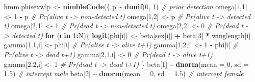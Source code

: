 \documentclass[
  12pt,
]{krantz}
\newenvironment{Shaded}{\begin{snugshade}}{\end{snugshade}}
\newcommand{\AttributeTok}[1]{\textcolor[rgb]{0.13,0.29,0.53}{#1}}
\newcommand{\CommentTok}[1]{\textcolor[rgb]{0.56,0.35,0.01}{\textit{#1}}}
\newcommand{\ControlFlowTok}[1]{\textcolor[rgb]{0.13,0.29,0.53}{\textbf{#1}}}
\newcommand{\DecValTok}[1]{\textcolor[rgb]{0.00,0.00,0.81}{#1}}
\newcommand{\FloatTok}[1]{\textcolor[rgb]{0.00,0.00,0.81}{#1}}
\newcommand{\FunctionTok}[1]{\textcolor[rgb]{0.13,0.29,0.53}{\textbf{#1}}}
\newcommand{\NormalTok}[1]{#1}
\newcommand{\OtherTok}[1]{\textcolor[rgb]{0.56,0.35,0.01}{#1}}
\newcommand{\SpecialCharTok}[1]{\textcolor[rgb]{0.81,0.36,0.00}{\textbf{#1}}}
\begin{document}
\begin{Shaded}
\begin{Highlighting}[]
\NormalTok{hmm.phisexwlp }\OtherTok{\textless{}{-}} \FunctionTok{nimbleCode}\NormalTok{(\{}
\NormalTok{  p }\SpecialCharTok{\textasciitilde{}} \FunctionTok{dunif}\NormalTok{(}\DecValTok{0}\NormalTok{, }\DecValTok{1}\NormalTok{) }\CommentTok{\# prior detection}
\NormalTok{  omega[}\DecValTok{1}\NormalTok{,}\DecValTok{1}\NormalTok{] }\OtherTok{\textless{}{-}} \DecValTok{1} \SpecialCharTok{{-}}\NormalTok{ p    }\CommentTok{\# Pr(alive t {-}\textgreater{} non{-}detected t)}
\NormalTok{  omega[}\DecValTok{1}\NormalTok{,}\DecValTok{2}\NormalTok{] }\OtherTok{\textless{}{-}}\NormalTok{ p        }\CommentTok{\# Pr(alive t {-}\textgreater{} detected t)}
\NormalTok{  omega[}\DecValTok{2}\NormalTok{,}\DecValTok{1}\NormalTok{] }\OtherTok{\textless{}{-}} \DecValTok{1}        \CommentTok{\# Pr(dead t {-}\textgreater{} non{-}detected t)}
\NormalTok{  omega[}\DecValTok{2}\NormalTok{,}\DecValTok{2}\NormalTok{] }\OtherTok{\textless{}{-}} \DecValTok{0}        \CommentTok{\# Pr(dead t {-}\textgreater{} detected t)}
  \ControlFlowTok{for}\NormalTok{ (i }\ControlFlowTok{in} \DecValTok{1}\SpecialCharTok{:}\NormalTok{N)\{}
    \FunctionTok{logit}\NormalTok{(phi[i]) }\OtherTok{\textless{}{-}}\NormalTok{ beta[sex[i]] }\SpecialCharTok{+}\NormalTok{ beta[}\DecValTok{3}\NormalTok{] }\SpecialCharTok{*}\NormalTok{ winglength[i]}
\NormalTok{    gamma[}\DecValTok{1}\NormalTok{,}\DecValTok{1}\NormalTok{,i] }\OtherTok{\textless{}{-}}\NormalTok{ phi[i]      }\CommentTok{\# Pr(alive t {-}\textgreater{} alive t+1)}
\NormalTok{    gamma[}\DecValTok{1}\NormalTok{,}\DecValTok{2}\NormalTok{,i] }\OtherTok{\textless{}{-}} \DecValTok{1} \SpecialCharTok{{-}}\NormalTok{ phi[i]  }\CommentTok{\# Pr(alive t {-}\textgreater{} dead t+1)}
\NormalTok{    gamma[}\DecValTok{2}\NormalTok{,}\DecValTok{1}\NormalTok{,i] }\OtherTok{\textless{}{-}} \DecValTok{0}           \CommentTok{\# Pr(dead t {-}\textgreater{} alive t+1)}
\NormalTok{    gamma[}\DecValTok{2}\NormalTok{,}\DecValTok{2}\NormalTok{,i] }\OtherTok{\textless{}{-}} \DecValTok{1}           \CommentTok{\# Pr(dead t {-}\textgreater{} dead t+1)}
\NormalTok{  \}}
\NormalTok{  beta[}\DecValTok{1}\NormalTok{] }\SpecialCharTok{\textasciitilde{}} \FunctionTok{dnorm}\NormalTok{(}\AttributeTok{mean =} \DecValTok{0}\NormalTok{, }\AttributeTok{sd =} \FloatTok{1.5}\NormalTok{) }\CommentTok{\# intercept male}
\NormalTok{  beta[}\DecValTok{2}\NormalTok{] }\SpecialCharTok{\textasciitilde{}} \FunctionTok{dnorm}\NormalTok{(}\AttributeTok{mean =} \DecValTok{0}\NormalTok{, }\AttributeTok{sd =} \FloatTok{1.5}\NormalTok{) }\CommentTok{\# intercept female}

\end{Highlighting}
\end{Shaded}
\end{document}
